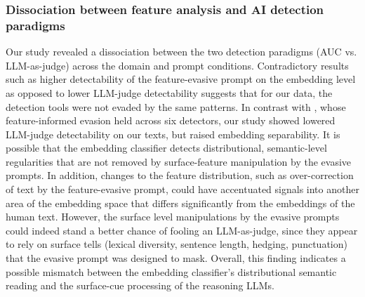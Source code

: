 \documentclass[thesis]{cluu}
\begin{document}
\subsubsection{Dissociation between feature analysis and AI detection paradigms} Our study revealed a dissociation between the two detection paradigms (AUC vs. LLM-as-judge) across the domain and prompt conditions. Contradictory results such as higher detectability of the feature-evasive prompt on the embedding level as opposed to lower LLM-judge detectability suggests that for our data, the detection tools were not evaded by the same patterns. In contrast with \textcite{lu2024sico}, whose feature-informed evasion held across six detectors, our study showed lowered LLM-judge detectability on our texts, but raised embedding separability. It is possible that the embedding classifier detects distributional, semantic-level regularities that are not removed by surface-feature manipulation by the evasive prompts. In addition, changes to the feature distribution, such as over-correction of text by the feature-evasive prompt, could have accentuated signals into another area of the embedding space that differs significantly from the embeddings of the human text. However, the surface level manipulations by the evasive prompts could indeed stand a better chance of fooling an LLM-as-judge, since they appear to rely on surface tells (lexical diversity, sentence length, hedging, punctuation) that the evasive prompt was designed to mask. Overall, this finding indicates a possible mismatch between the embedding classifier's distributional semantic reading and the surface-cue processing of the reasoning LLMs.
\end{document}
